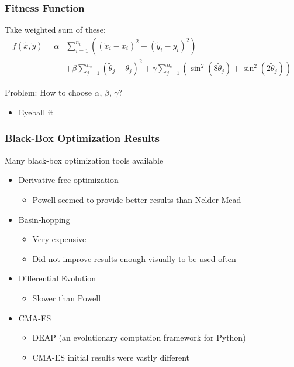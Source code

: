 \documentclass[12pt,t,xcolor=dvipsnames]{beamer}
\begin{document}
\begin{frame}
\frametitle{Fitness Function}

Take weighted sum of these:
\begin{align*}
f(\tilde{x},\tilde{y}) = \alpha&\sum_{i=1}^{n_v}
\left((\tilde{x}_i-x_i)^2+(\tilde{y}_i - y_i)^2\right)\\
& + \beta\sum_{j=1}^{n_e} \left(\tilde{\theta}_j - \theta_j\right)^2
+\gamma\sum_{j=1}^{n_e}\left(\sin^2(8\tilde{\theta}_j)+\sin^2(2\tilde{\theta}_j)\right)
\end{align*}

Problem: How to choose $\alpha$, $\beta$, $\gamma$?
\begin{itemize}
\item Eyeball it
\end{itemize}

\end{frame}

\begin{frame}
  \frametitle{Black-Box Optimization Results}

  Many black-box optimization tools available
  \begin{itemize}
  \item Derivative-free optimization
    \begin{itemize}
    \item Powell seemed to provide better results than Nelder-Mead
    \end{itemize}
  \item Basin-hopping
    \begin{itemize}
    \item Very expensive
	\item Did not improve results enough visually to be used often
    \end{itemize}
  \item Differential Evolution
    \begin{itemize}
    \item Slower than Powell
    \end{itemize}
  \item CMA-ES
    \begin{itemize}
      \item DEAP (an evolutionary comptation framework for Python)
	  \item CMA-ES initial results were vastly different
    \end{itemize}
  \end{itemize}

\end{frame}
\end{document}
